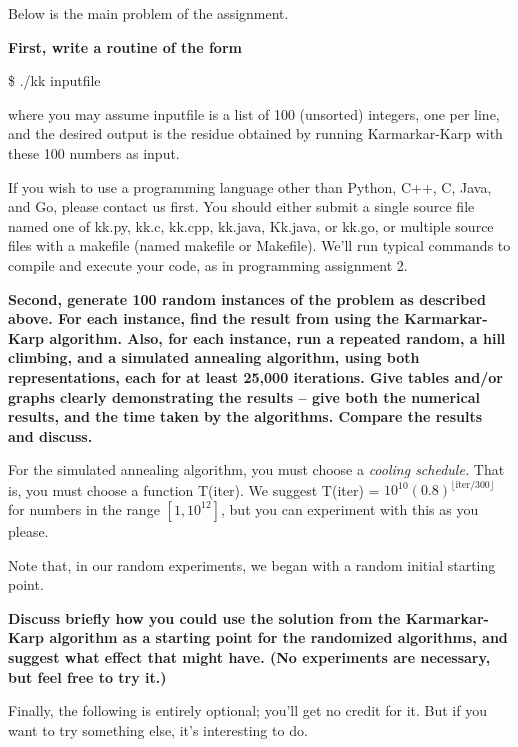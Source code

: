 \documentclass[11pt]{article}
\begin{document}
Below is the main problem of the assignment.

\smallskip 

{\bf First, write a routine of the form 

\noindent \$ ./kk inputfile 

where you may assume inputfile is a list of 100 (unsorted) integers,
one per line, and the desired output is the residue obtained by running
Karmarkar-Karp with these 100 numbers as input.}

If you wish to use a programming language other than Python, C++, C, Java, and Go, please contact us first. You should either submit a single source file named one of kk.py, kk.c, kk.cpp, kk.java, Kk.java, or kk.go, or multiple source files with a makefile (named makefile or Makefile). We'll run typical commands to compile and execute your code, as in programming assignment 2.

\smallskip 
{\bf Second, generate 100 random instances of the problem as described above.
For each instance, find the result from using the Karmarkar-Karp
algorithm.  Also, for each instance, run a repeated random, a hill
climbing, and a simulated annealing algorithm, using both
representations, each for at least 25,000 iterations.  Give tables and/or
graphs
clearly demonstrating the results -- give both the numerical results,
and the time taken by the algorithms.  Compare the results and discuss.}
\smallskip 

For the simulated annealing algorithm, you must choose a {\em cooling
schedule.}  That is, you must choose a function T(iter).  We suggest
T(iter) = $10^{10}(0.8)^{\lfloor \mbox{iter} / 300 \rfloor}$ for
numbers in the range $[1,10^{12}]$, but you can experiment with this
as you please.  

Note that, in our random experiments, we began with a random initial
starting point.

{\bf Discuss briefly how you could use the solution from the
Karmarkar-Karp algorithm as a starting point for the randomized
algorithms, and suggest what effect that might have. 
(No experiments are necessary, but feel free to try it.)}

Finally, the following is entirely optional;  you'll get no credit for it.
But if you want to try something else, it's interesting to do.
\end{document}

